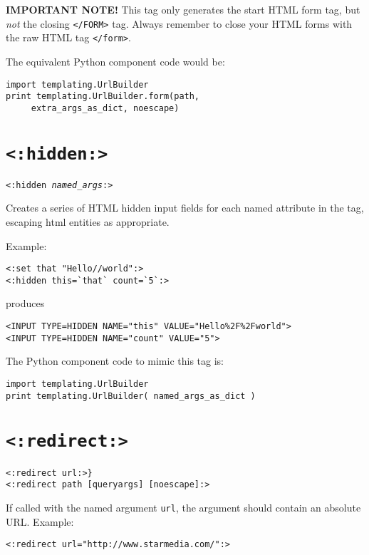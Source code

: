 \documentclass{manual}
\begin{document}
\textbf{IMPORTANT NOTE!} This tag only generates the start HTML
form tag, but \emph{not} the closing \texttt{</FORM>} tag.
Always remember to close your HTML forms with the raw HTML tag
\texttt{</form>}.

The equivalent Python component code would be:
\begin{verbatim}
import templating.UrlBuilder
print templating.UrlBuilder.form(path,
     extra_args_as_dict, noescape)
\end{verbatim}



\section{\texttt{<:hidden:>}}
\label{taghidden}

\texttt{<:hidden \emph{named_args}:>}

Creates a series of HTML hidden input fields for each named attribute
in the tag, escaping html entities as appropriate.

Example:

\begin{verbatim}
<:set that "Hello//world":>
<:hidden this=`that` count=`5`:>
\end{verbatim}

produces

\begin{verbatim}
<INPUT TYPE=HIDDEN NAME="this" VALUE="Hello%2F%2Fworld">
<INPUT TYPE=HIDDEN NAME="count" VALUE="5">
\end{verbatim}


The Python component code to mimic this tag is:
\begin{verbatim}
import templating.UrlBuilder
print templating.UrlBuilder( named_args_as_dict )
\end{verbatim}


\section{\texttt{<:redirect:>}}
\label{tagredirect}

\begin{verbatim}
<:redirect url:>}
<:redirect path [queryargs] [noescape]:>
\end{verbatim}

If called with the named argument \texttt{url}, the argument
should contain an absolute URL. Example:

\begin{verbatim}<:redirect url="http://www.starmedia.com/":>\end{verbatim}
\end{document}
